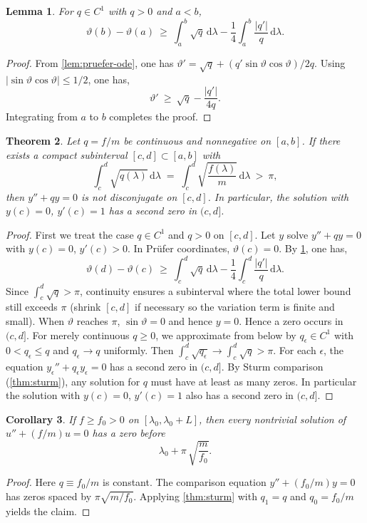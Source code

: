 \documentclass[a4paper, reqno]{amsart}
\numberwithin{equation}{section}
\theoremstyle{plain}
\newtheorem{theorem}{Theorem}[section]
\newtheorem{lemma}[theorem]{Lemma}
\newtheorem{corollary}[theorem]{Corollary}
\theoremstyle{definition}
\theoremstyle{remark}
\newcommand{\dd}{\mathrm{d}}
\newcommand{\lam}{\lambda}
\newcommand{\lamo}{\lambda_0}
\begin{document}
\begin{lemma}\label{lem:theta-lb}
For $q\in C^1$ with $q>0$ and $a<b$,
\[
\vartheta(b)-\vartheta(a)\ \ge\ \int_a^b \sqrt{q}\,\dd\lam - \frac{1}{4}\int_a^b \frac{|q'|}{q}\,\dd\lam.
\]
\end{lemma}
\begin{proof}
From \cref{lem:pruefer-ode}, one has $\vartheta'=\sqrt{q}+(q'\sin\vartheta\cos\vartheta)/2q$. Using $|\sin\vartheta\cos\vartheta|\le 1/2$, one has,
$$\vartheta'\ \ge\ \sqrt{q}-\frac{|q'|}{4q}.$$
Integrating from $a$ to $b$ completes the proof.

\end{proof}

\begin{theorem}\label{thm:intcrit}
Let $q=f/m$ be continuous and nonnegative on $[a,b]$. If there exists a compact subinterval $[c,d]\subset[a,b]$ with
$$\int_c^d \sqrt{q(\lam)}\,\dd\lam \;=\;\int_c^d \sqrt{\frac{f(\lam)}{m}}\,\dd\lam\ >\ \pi,$$
then $y''+q y=0$ is not disconjugate on $[c,d]$. In particular, the solution with $y(c)=0$, $y'(c)=1$ has a second zero in $(c,d]$.
\end{theorem}
\begin{proof}
First we treat the case $q\in C^1$ and $q>0$ on $[c,d]$. Let $y$ solve $y''+q y=0$ with $y(c)=0$, $y'(c)>0$. In Prüfer coordinates, $\vartheta(c)=0$. By \cref{lem:theta-lb}, one has,
$$\vartheta(d)-\vartheta(c)\ \ge\ \int_c^d\sqrt{q}\,\dd\lam-\frac{1}{4}\int_c^d\frac{|q'|}{q}\,\dd\lam.$$
Since $\int_c^d \sqrt{q}>\pi$, continuity ensures a subinterval where the total lower bound still exceeds $\pi$ (shrink $[c,d]$ if necessary so the variation term is finite and small). When $\vartheta$ reaches $\pi$, $\sin\vartheta=0$ and hence $y=0$. Hence a zero occurs in $(c,d]$. For merely continuous $q\ge 0$, we approximate from below by $q_\epsilon\in C^1$ with $0<q_\epsilon\le q$ and $q_\epsilon\to q$ uniformly. Then $\int_c^d\sqrt{q_\epsilon}\to\int_c^d\sqrt{q}>\pi$. For each $\epsilon$, the equation $y_\epsilon''+q_\epsilon y_\epsilon=0$ has a second zero in $(c,d]$. By Sturm comparison (\cref{thm:sturm}), any solution for $q$ must have at least as many zeros. In particular the solution with $y(c)=0$, $y'(c)=1$ also has a second zero in $(c,d]$.

\end{proof}

\begin{corollary}\label{cor:const}
If $f\ge f_0>0$ on $[\lamo,\lamo+L]$, then every nontrivial solution of $u''+(f/m)u=0$ has a zero before
$$\lamo+\pi\,\sqrt{\frac{m}{f_0}}.$$
\end{corollary}
\begin{proof}
Here $q\equiv f_0/m$ is constant. The comparison equation $y''+(f_0/m)y=0$ has zeros spaced by $\pi\sqrt{m/f_0}$. Applying \cref{thm:sturm} with $q_1=q$ and $q_0=f_0/m$ yields the claim.

\end{proof}
\end{document}
